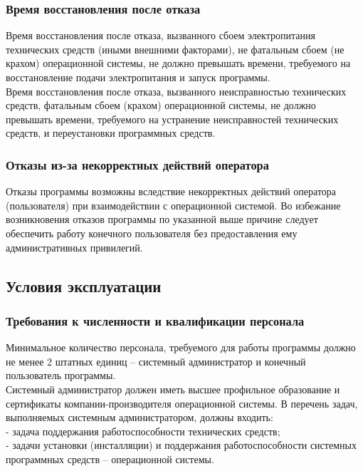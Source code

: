 \documentclass{article}
\begin{document}
        \subsubsection{Время восстановления после отказа}
        Время восстановления после отказа, вызванного сбоем электропитания технических средств (иными внешними факторами), не фатальным сбоем (не крахом) операционной системы, не должно превышать времени, требуемого на восстановление подачи электропитания и запуск программы.\\
        Время восстановления после отказа, вызванного неисправностью технических средств, фатальным сбоем (крахом) операционной системы, не должно превышать времени, требуемого на устранение неисправностей технических средств, и переустановки программных средств.
        
        \subsubsection{Отказы из-за некорректных действий оператора}
        Отказы программы возможны вследствие некорректных действий оператора (пользователя) при взаимодействии с операционной системой. Во избежание возникновения отказов программы по указанной выше причине следует обеспечить работу конечного пользователя без предоставления ему административных привилегий.
        
    \subsection{Условия эксплуатации}
        \subsubsection{Требования к численности и квалификации персонала}
        Минимальное количество персонала, требуемого для работы программы должно не менее 2 штатных единиц – системный администратор и конечный пользователь программы.\\
        Системный администратор должен иметь высшее профильное образование и сертификаты компании-производителя операционной системы. В перечень задач, выполняемых системным администратором, должны входить:\\
        -	задача поддержания работоспособности технических средств;\\
        -	задачи установки (инсталляции) и поддержания работоспособности системных программных средств – операционной системы.
\end{document}
